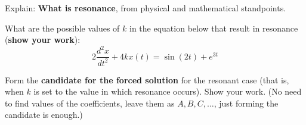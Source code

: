 \documentclass[10pt,twoside,sfsidenotes]{tufte-handout}
\begin{document}
\clearpage
\begin{question}
  \begin{fullwidth}
    Explain: \textbf{What is resonance}, from physical and mathematical standpoints.

    \vspace{2in}

    What are the possible values of \(k\) in the equation below that result in resonance (\textbf{show your work}):
    \[
      2 \frac{d^{2}x}{dt^{2}} + 4 k x(t) = \sin(2t) + e^{3t}
    \]

    \vfill

    Form the \textbf{candidate for the forced solution} for the resonant case (that is, when \(k\) is set to the value in which resonance occurs). Show your work. (No need to find values of the coefficients, leave them as \(A,B,C,\dots\), just forming the candidate is enough.)

    \vfill

  \end{fullwidth}
\end{question}
\end{document}
